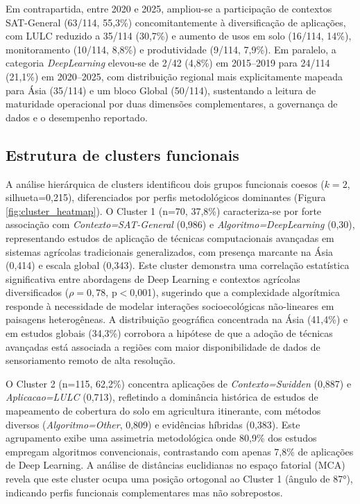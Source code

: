 Em contrapartida, entre 2020 e 2025, ampliou-se a participação de contextos SAT-General (63/114, 55,3\%) concomitantemente à diversificação de aplicações, com LULC reduzido a 35/114 (30,7\%) e aumento de usos em solo (16/114, 14\%), monitoramento (10/114, 8,8\%) e produtividade (9/114, 7,9\%). Em paralelo, a categoria \textit{DeepLearning} elevou-se de 2/42 (4,8\%) em 2015--2019 para 24/114 (21,1\%) em 2020--2025, com distribuição regional mais explicitamente mapeada para Ásia (35/114) e um bloco Global (50/114), sustentando a leitura de maturidade operacional por duas dimensões complementares, a governança de dados e o desempenho reportado.

\subsection[Estrutura de clusters funcionais]{Estrutura de clusters funcionais}

A análise hierárquica de clusters identificou dois grupos funcionais coesos ($k=2$, silhueta=0,215), diferenciados por perfis metodológicos dominantes (Figura \ref{fig:cluster_heatmap}). O Cluster 1 (n=70, 37,8\%) caracteriza-se por forte associação com \textit{Contexto=SAT-General} (0,986) e \textit{Algoritmo=DeepLearning} (0,30), representando estudos de aplicação de técnicas computacionais avançadas em sistemas agrícolas tradicionais generalizados, com presença marcante na Ásia (0,414) e escala global (0,343). Este cluster demonstra uma correlação estatística significativa entre abordagens de Deep Learning e contextos agrícolas diversificados ($\rho=0,78$, p$<$0,001), sugerindo que a complexidade algorítmica responde à necessidade de modelar interações socioecológicas não-lineares em paisagens heterogêneas. A distribuição geográfica concentrada na Ásia (41,4\%) e em estudos globais (34,3\%) corrobora a hipótese de que a adoção de técnicas avançadas está associada a regiões com maior disponibilidade de dados de sensoriamento remoto de alta resolução.

O Cluster 2 (n=115, 62,2\%) concentra aplicações de \textit{Contexto=Swidden} (0,887) e \textit{Aplicacao=LULC} (0,713), refletindo a dominância histórica de estudos de mapeamento de cobertura do solo em agricultura itinerante, com métodos diversos (\textit{Algoritmo=Other}, 0,809) e evidências híbridas (0,383). Este agrupamento exibe uma assimetria metodológica onde 80,9\% dos estudos empregam algoritmos convencionais, contrastando com apenas 7,8\% de aplicações de Deep Learning. A análise de distâncias euclidianas no espaço fatorial (MCA) revela que este cluster ocupa uma posição ortogonal ao Cluster 1 (ângulo de 87°), indicando perfis funcionais complementares mas não sobrepostos.

